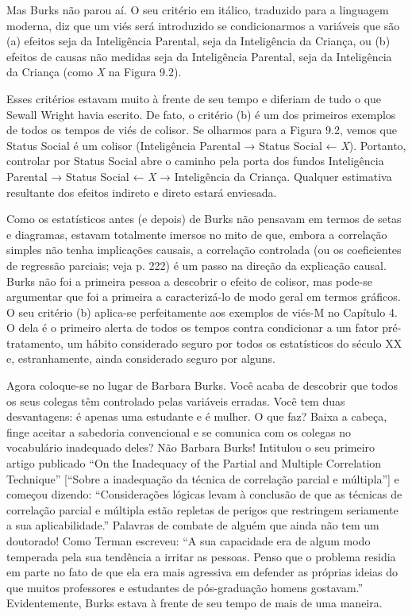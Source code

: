 \documentclass[11pt,a5paper,twoside]{book}
\begin{document}
Mas Burks não parou aí. O seu critério em itálico, traduzido para a linguagem moderna, diz que um viés será introduzido se condicionarmos a variáveis que são (a) efeitos seja da Inteligência Parental, seja da Inteligência da Criança, ou (b) efeitos de causas não medidas seja da Inteligência Parental, seja da Inteligência da Criança (como \textit{X} na Figura 9.2).

Esses critérios estavam muito à frente de seu tempo e diferiam de tudo o que Sewall Wright havia escrito. De fato, o critério (b) é um dos primeiros exemplos de todos os tempos de viés de colisor. Se olharmos para a Figura 9.2, vemos que Status Social é um colisor (Inteligência Parental → Status Social ← \textit{X}). Portanto, controlar por Status Social abre o caminho pela porta dos fundos Inteligência Parental → Status Social ← \textit{X} → Inteligência da Criança. Qualquer estimativa resultante dos efeitos indireto e direto estará enviesada.

Como os estatísticos antes (e depois) de Burks não pensavam em termos de setas e diagramas, estavam totalmente imersos no mito de que, embora a correlação simples não tenha implicações causais, a correlação controlada (ou os coeficientes de regressão parciais; veja p. 222) é um passo na direção da explicação causal. Burks não foi a primeira pessoa a descobrir o efeito de colisor, mas pode-se argumentar que foi a primeira a caracterizá-lo de modo geral em termos gráficos. O seu critério (b) aplica-se perfeitamente aos exemplos de viés-M no Capítulo 4. O dela é o primeiro alerta de todos os tempos contra condicionar a um fator pré-tratamento, um hábito considerado seguro por todos os estatísticos do século XX e, estranhamente, ainda considerado seguro por alguns.

Agora coloque-se no lugar de Barbara Burks. Você acaba de descobrir que todos os seus colegas têm controlado pelas variáveis erradas. Você tem duas desvantagens: é apenas uma estudante e é mulher. O que faz? Baixa a cabeça, finge aceitar a sabedoria convencional e se comunica com os colegas no vocabulário inadequado deles? Não Barbara Burks! Intitulou o seu primeiro artigo publicado “On the Inadequacy of the Partial and Multiple Correlation Technique” [“Sobre a inadequação da técnica de correlação parcial e múltipla”] e começou dizendo: “Considerações lógicas levam à conclusão de que as técnicas de correlação parcial e múltipla estão repletas de perigos que restringem seriamente a sua aplicabilidade.” Palavras de combate de alguém que ainda não tem um doutorado! Como Terman escreveu: “A sua capacidade era de algum modo temperada pela sua tendência a irritar as pessoas. Penso que o problema residia em parte no fato de que ela era mais agressiva em defender as próprias ideias do que muitos professores e estudantes de pós-graduação homens gostavam.” Evidentemente, Burks estava à frente de seu tempo de mais de uma maneira.
\end{document}
